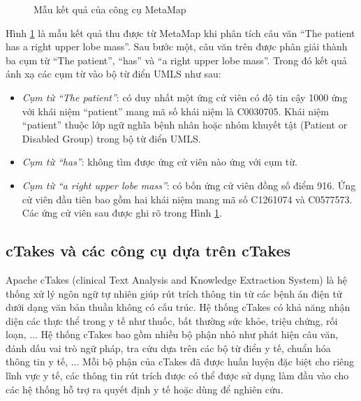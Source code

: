 \begin{figure}[ht]
\centering
{}

\caption{Mẫu kết quả của công cụ MetaMap\label{metamapoutput}}
\end{figure}

Hình \ref{metamapoutput} là mẫu kết quả thu được từ MetaMap khi phân tích câu văn ``The patient has a right upper lobe mass''. Sau bước một, câu văn trên được phân giải thành ba cụm từ ``The patient'', ``has'' và ``a right upper lobe mass''. Trong đó kết quả ánh xạ các cụm từ vào bộ từ điển UMLS như sau:

\begin{itemize}[noitemsep]
\item \emph{Cụm từ ``The patient''}: có duy nhất một ứng cử viên có độ tin cậy 1000 ứng với khái niệm ``patient'' mang mã số khái niệm là C0030705. Khái niệm ``patient'' thuộc lớp ngữ nghĩa bệnh nhân hoặc nhóm khuyết tật (Patient or Disabled Group) trong bộ từ điển UMLS.
\item \emph{Cụm từ ``has''}: không tìm được ứng cử viên nào ứng với cụm từ.
\item \emph{Cụm từ ``a right upper lobe mass''}: có bốn ứng cử viên đồng số điểm 916. Ứng cử viên đầu tiên bao gồm hai khái niệm mang mã số C1261074 và C0577573. Các ứng cử viên sau được ghi rõ trong Hình \ref{metamapoutput}. 
\end{itemize}

\subsection*{cTakes và các công cụ dựa trên cTakes}
Apache cTakes (clinical Text Analysis and Knowledge Extraction System) là hệ thống xử lý ngôn ngữ tự nhiên giúp rút trích thông tin từ các bệnh án điện tử dưới dạng văn bản thuần không có cấu trúc. Hệ thống cTakes có khả năng nhận diện các thực thể trong y tế như thuốc, bất thường sức khỏe, triệu chứng, rối loạn, ... Hệ thống cTakes bao gồm nhiều bộ phận nhỏ như phát hiện câu văn, đánh dấu vai trò ngữ pháp, tra cứu dựa trên các bộ từ điển y tế, chuẩn hóa thông tin y tế, ... Mỗi bộ phận của cTakes đã được huấn luyện đặc biệt  cho riêng lĩnh vực y tế, các thông tin rút trích được có thể được sử dụng làm đầu vào cho các hệ thống hỗ trợ ra quyết định y tế hoặc dùng để nghiên cứu.


